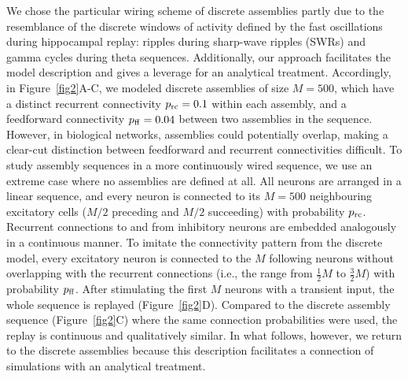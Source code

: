   We chose the particular wiring scheme of discrete assemblies partly due to
  the resemblance of the discrete windows of activity defined by the fast
  oscillations during hippocampal replay: ripples during sharp-wave ripples
  (SWRs) and gamma cycles during theta sequences. Additionally, our approach
  facilitates the model description and gives a leverage for an analytical
  treatment. Accordingly, in Figure~\ref{fig2}A-C, we modeled discrete assemblies
  of size $M=500$, which have a distinct recurrent connectivity $p_{\rm
  rc}=0.1$ within each assembly, and a feedforward connectivity $p_{\rm
  ff}=0.04$ between two assemblies in the sequence. However, in biological
  networks, assemblies could potentially overlap, making a clear-cut
  distinction between feedforward and recurrent connectivities difficult. To
  study assembly sequences in a more continuously wired sequence, we use an
  extreme case where no assemblies are defined at all. All neurons are arranged
  in a linear sequence, and every neuron is connected to its $M=500$
  neighbouring excitatory cells ($M/2$ preceding and $M/2$ succeeding) with
  probability $p_{\rm rc}$. Recurrent connections to and from inhibitory
  neurons are embedded analogously in a continuous manner. To imitate the
  connectivity pattern from the discrete model, every excitatory neuron is
  connected to the $M$ following neurons without overlapping with the recurrent
  connections (i.e., the range from $\frac{1}{2}M$ to $\frac{3}{2}M$) with
  probability $p_{\rm ff}$. After stimulating the first $M$ neurons with a
  transient input, the whole sequence is replayed (Figure~\ref{fig2}D). Compared
  to the discrete assembly sequence (Figure~\ref{fig2}C) where the same connection
  probabilities were used, the replay is continuous and qualitatively similar.
  In what follows, however, we return to the discrete assemblies because this
  description facilitates a connection of simulations with an analytical
  treatment.
  

